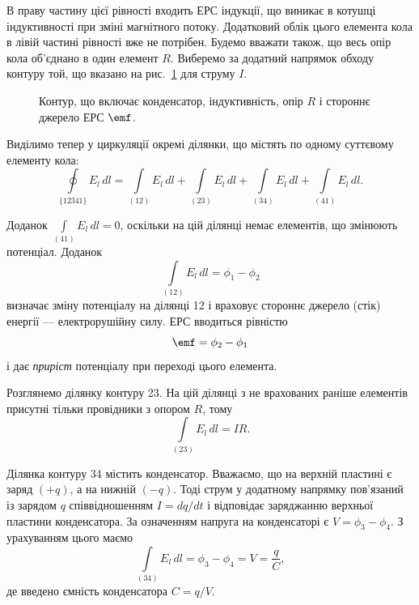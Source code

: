 В праву частину цієї рівності входить ЕРС індукції, що виникає в
котушці індуктивності при зміні магнітного потоку. Додатковий
облік цього елемента кола в лівій частині рівності вже не
потрібен. Будемо вважати також, що весь опір кола об'єднано в
один елемент $R$. Виберемо за додатний напрямок обходу контуру
той, що вказано на рис.~\ref{tikz:LCR_circuit} для струму $I$.

\begin{figure}[h!]
	\centering
	\caption{Контур, що включає конденсатор, індуктивність, опір $R$ і стороннє джерело ЕРС $\emf$.}
	\label{tikz:LCR_circuit}
\end{figure}

Виділимо тепер у циркуляції окремі ділянки, що містять по
одному суттєвому елементу кола:
\begin{equation}\label{eq:circulation_decomposed}
	\oint\limits_{\{12341\}} E_l \, dl
	= \int\limits_{(12)} E_l \, dl
	+ \int\limits_{(23)} E_l \, dl
	+ \int\limits_{(34)} E_l \, dl
	+ \int\limits_{(41)} E_l \, dl.
\end{equation}

Доданок $\int\limits_{(41)} E_l \, dl = 0$, оскільки на цій ділянці немає елементів, що
змінюють потенціал. Доданок
\begin{equation}\label{eq:phi12}
	\int\limits_{(12)} E_l \, dl = \phi_1 - \phi_2
\end{equation}
визначає зміну потенціалу на ділянці 12 і враховує стороннє
джерело (стік) енергії --- електрорушійну силу. ЕРС вводиться
рівністю
\begin{equation}\label{eq:EMF_definition}
	\emf = \phi_2 - \phi_1
\end{equation}
і дає \emph{приріст} потенціалу при переході цього елемента.

Розглянемо ділянку контуру 23. На цій ділянці з не врахованих
раніше елементів присутні тільки провідники з опором $R$, тому
\begin{equation}\label{eq:IR}
	\int\limits_{(23)} E_l \, dl = IR.
\end{equation}

Ділянка контуру 34 містить конденсатор. Вважаємо, що на верхній
пластині є заряд $(+q)$, а на нижній $(-q)$. Тоді струм у додатному
напрямку пов'язаний із зарядом $q$ співвідношенням $I = dq/dt$ і
відповідає заряджанню верхньої пластини конденсатора. За означенням
напруга на конденсаторі є $V = \phi_3 - \phi_4$. З урахуванням цього маємо
\begin{equation}\label{eq:capacitor_voltage}
	\int\limits_{(34)} E_l \, dl = \phi_3 - \phi_4 = V = \frac{q}{C},
\end{equation}
де введено ємність конденсатора $C = q/V$.

